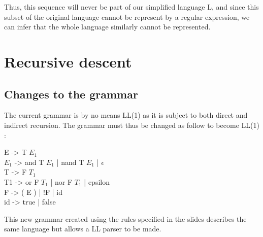\documentclass[a4paper, 11pt]{article}
\begin{document}
    	Thus, this sequence will never be part of our simplified language L, and since
    	this subset of the original language cannot be represent by a regular expression,
    	we can infer that the whole language similarly cannot be represented.

    \section{Recursive descent}
    \subsection{Changes to the grammar}

    	The current grammar is by no means LL(1) as it is subject to both direct and
    	indirect recursion. The grammar must thus be changed as follow to become LL(1) :
    	\newline

    	\begin{flushleft}
    	E -> T $E_1$ \\
    	$E_1$ -> and T $E_1$ | nand T $E_1$ | $\epsilon$ \\
    	T -> F $T_1$ \\
		T1 -> or F $T_1$ | nor F $T_1$ | epsilon \\
		F -> ( E ) | !F | id \\
		id -> true | false \\
		\end{flushleft}

    	This new grammar created using the rules specified in the slides describes
    	the same language but allows a LL parser to be made.
\end{document}
